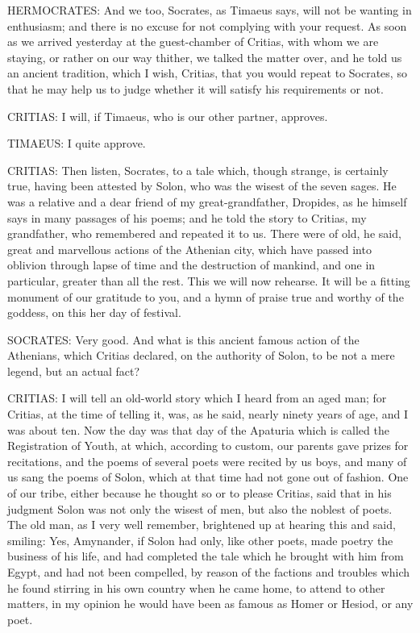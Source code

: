 HERMOCRATES: And we too, Socrates, as Timaeus says, will not be wanting in
enthusiasm; and there is no excuse for not complying with your request. As
soon as we arrived yesterday at the guest-chamber of Critias, with whom we
are staying, or rather on our way thither, we talked the matter over, and
he told us an ancient tradition, which I wish, Critias, that you would
repeat to Socrates, so that he may help us to judge whether it will
satisfy his requirements or not.

CRITIAS: I will, if Timaeus, who is our other partner, approves.

TIMAEUS: I quite approve.

CRITIAS: Then listen, Socrates, to a tale which, though strange, is
certainly true, having been attested by Solon, who was the wisest of the
seven sages. He was a relative and a dear friend of my great-grandfather,
Dropides, as he himself says in many passages of his poems; and he told
the story to Critias, my grandfather, who remembered and repeated it to
us. There were of old, he said, great and marvellous actions of the
Athenian city, which have passed into oblivion through lapse of time and
the destruction of mankind, and one in particular, greater than all the
rest. This we will now rehearse. It will be a fitting monument of our
gratitude to you, and a hymn of praise true and worthy of the goddess, on
this her day of festival.

SOCRATES: Very good. And what is this ancient famous action of the
Athenians, which Critias declared, on the authority of Solon, to be not a
mere legend, but an actual fact?

CRITIAS: I will tell an old-world story which I heard from an aged man;
for Critias, at the time of telling it, was, as he said, nearly ninety
years of age, and I was about ten. Now the day was that day of the
Apaturia which is called the Registration of Youth, at which, according to
custom, our parents gave prizes for recitations, and the poems of several
poets were recited by us boys, and many of us sang the poems of Solon,
which at that time had not gone out of fashion. One of our tribe, either
because he thought so or to please Critias, said that in his judgment
Solon was not only the wisest of men, but also the noblest of poets. The
old man, as I very well remember, brightened up at hearing this and said,
smiling: Yes, Amynander, if Solon had only, like other poets, made poetry
the business of his life, and had completed the tale which he brought with
him from Egypt, and had not been compelled, by reason of the factions and
troubles which he found stirring in his own country when he came home, to
attend to other matters, in my opinion he would have been as famous as
Homer or Hesiod, or any poet.

